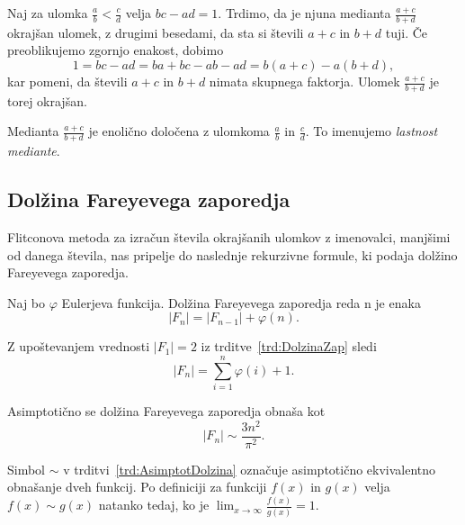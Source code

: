 \documentclass[mat1]{fmfdelo}
\begin{document}
\begin{dokaz}
Naj za ulomka $\frac{a}{b} < \frac{c}{d}$ velja $bc - ad = 1$. Trdimo, da je njuna medianta $\frac{a+c}{b+d}$ okrajšan ulomek, z drugimi besedami, da sta si števili $a+c$ in $b+d$ tuji. Če preoblikujemo zgornjo enakost, dobimo 
\[ 1 = bc - ad = ba + bc - ab - ad = b(a + c) - a(b + d), \]
kar pomeni, da števili $a+c$ in $b+d$ nimata skupnega faktorja. Ulomek $\frac{a+c}{b+d}$ je torej okrajšan.
\end{dokaz}

\begin{opomba}
Medianta $\frac{a+c}{b+d}$ je enolično določena z ulomkoma $\frac{a}{b}$ in $\frac{c}{d}$. To imenujemo \emph{lastnost mediante}.
\end{opomba}

%
\subsection{Dolžina Fareyevega zaporedja}

Flitconova metoda za izračun števila okrajšanih ulomkov z imenovalci, manjšimi od danega števila, nas pripelje do naslednje rekurzivne formule, ki podaja dolžino Fareyevega zaporedja.

\begin{trditev}
\label{trd:DolzinaZap}
Naj bo $\varphi$ Eulerjeva funkcija. Dolžina Fareyevega zaporedja reda n je enaka
\begin{equation}
|F_{n}| = |F_{n-1}| + \varphi(n).
\end{equation}
\end{trditev}

\begin{opomba}
\label{op:AsimptotDolzina}
Z upoštevanjem vrednosti $|F_{1}| = 2$ iz trditve~\ref{trd:DolzinaZap} sledi \[  |F_{n}| = \sum_{i=1}^n \varphi(i) + 1. \]
\end{opomba}

\begin{trditev}
\label{trd:AsimptotDolzina}
Asimptotično se dolžina Fareyevega zaporedja obnaša kot
\begin{equation}
|F_{n}|\sim\frac{3n^2}{\pi^2}.
\end{equation}
\end{trditev}

\begin{opomba}
Simbol $\sim$ v trditvi~\ref{trd:AsimptotDolzina} označuje asimptotično ekvivalentno obnašanje dveh funkcij.
Po definiciji za funkciji $f(x)$ in $g(x)$ velja $f(x) \sim g(x)$ natanko tedaj, ko je $ \lim_{x \to \infty} \frac{f(x)}{g(x)} = 1$.
\end{opomba}
\end{document}
